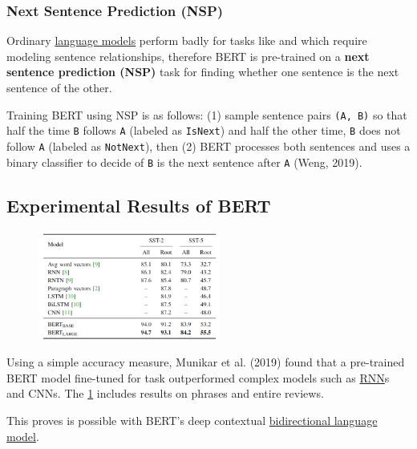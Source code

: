 \subsubsection{Next Sentence Prediction (NSP)} \label{sec:nextsentencepredictionNSP}

Ordinary \hyperref[sec:LanguageModels]{language models} perform badly for tasks like  and  which require modeling sentence relationships, therefore BERT is pre-trained on a \textbf{next sentence prediction (NSP)} task for finding whether one sentence is the next sentence of the other. 

Training BERT using NSP is as follows: (1) sample sentence pairs \texttt{(A, B)} so that half the time \texttt{B} follows \texttt{A} (labeled as \texttt{IsNext}) and half the other time, \texttt{B} does not follow \texttt{A} (labeled as \texttt{NotNext}), then (2) BERT processes both sentences and uses a binary classifier to decide of \texttt{B} is the next sentence after \texttt{A} (Weng, 2019). 


\subsection{Experimental Results of BERT} \label{sec:BERTExperimentalResults}

\begin{program}
\begin{figure}
\begin{center}
    \includegraphics[width=0.53\textwidth]{imgs/table_bert_vsOtherModels.png}
\end{center}
\label{tbl:bertExperimentResults}
\end{figure}

Using a simple accuracy measure, Munikar et al. (2019) found that a pre-trained BERT model fine-tuned for  task outperformed complex models such as \hyperref[sec:RNN]{RNN}s and CNNs. The \cref{tbl:bertExperimentResults} includes results on phrases and entire reviews. 


This proves  is possible with BERT's deep contextual \hyperref[sec:BidirectionalLM]{bidirectional language model}.
\end{program}


